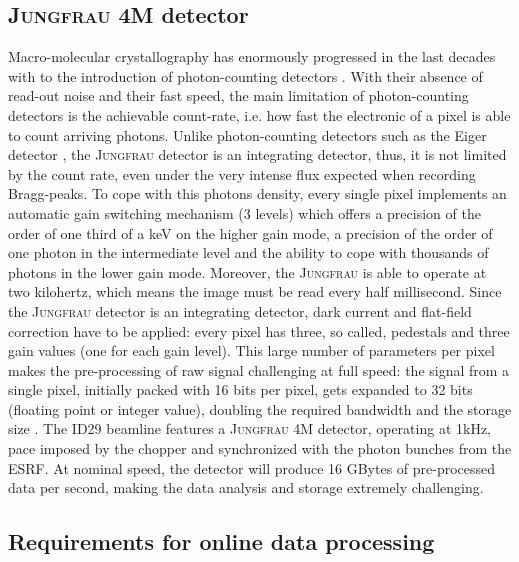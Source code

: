 \documentclass[preprint]{iucr}              %
\begin{document}
\subsection{\textsc{Jungfrau} 4M detector}
Macro-molecular crystallography has enormously progressed in the last decades with to the introduction of photon-counting detectors \cite{pilatus}. 
With their absence of read-out noise and their fast speed, the main limitation of photon-counting detectors is the achievable count-rate, i.e. how fast the electronic of a pixel is able to count arriving photons.
Unlike photon-counting detectors such as the Eiger detector \cite{Eiger}, the \textsc{Jungfrau} detector \cite{jungfrau2016} is an integrating detector, thus, it is not limited by the count rate, even under the very intense flux expected when recording Bragg-peaks.
To cope with this photons density, every single pixel implements an automatic gain switching mechanism (3 levels) which offers a precision of the order of one third of a keV on the higher gain mode, a precision of the order of one photon in the intermediate level and the ability to cope with thousands of photons in the lower gain mode.
Moreover, the \textsc{Jungfrau} is able to operate at two kilohertz, which means the image must be read every half millisecond.
Since the \textsc{Jungfrau} detector is an integrating detector, dark current and flat-field correction have to be applied: every pixel has three, so called, pedestals and three gain values (one for each gain level). 
This large number of parameters per pixel makes the pre-processing of raw signal challenging at full speed: the signal from a single pixel, initially packed with 16 bits per pixel, gets expanded to 32 bits (floating point or integer value), doubling the required bandwidth and the storage size \cite{jungfrau_PSI}.
The ID29 beamline features a \textsc{Jungfrau} 4M detector, operating at 1kHz, pace imposed by the chopper and synchronized with the photon bunches from the ESRF.
At nominal speed, the detector will produce 16 GBytes of pre-processed data per second, making the data analysis and storage extremely challenging.

\subsection{Requirements for online data processing}
\end{document}
